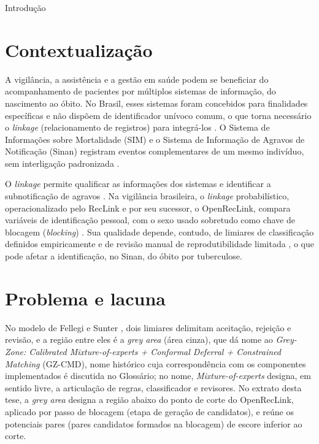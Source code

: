 \begin{chapter}{Introdução}\label{cap:introducao}



\section{Contextualização}\label{sec:contextualizacao}

A vigilância, a assistência e a gestão em saúde podem se beneficiar do acompanhamento de pacientes por múltiplos sistemas de informação, do nascimento ao óbito. No Brasil, esses sistemas foram concebidos para finalidades específicas e não dispõem de identificador unívoco comum, o que torna necessário o \textit{linkage} (relacionamento de registros) para integrá-los \cite{Camargo2000reclink}. O Sistema de Informações sobre Mortalidade (SIM) e o Sistema de Informação de Agravos de Notificação (Sinan) registram eventos complementares de um mesmo indivíduo, sem interligação padronizada \cite{Barreto2019The}.

O \textit{linkage} permite qualificar as informações dos sistemas \cite{Bartholomay2014improved} e identificar a subnotificação de agravos \cite{Oliveira2012uso}. Na vigilância brasileira, o \textit{linkage} probabilístico, operacionalizado pelo RecLink \cite{Camargo2000reclink} e por seu sucessor, o OpenRecLink, compara variáveis de identificação pessoal, com o sexo usado sobretudo como chave de blocagem (\textit{blocking}) \cite{Coeli2002blocking}. Sua qualidade depende, contudo, de limiares de classificação definidos empiricamente e de revisão manual de reprodutibilidade limitada \cite{Christen2012book}, o que pode afetar a identificação, no Sinan, do óbito por tuberculose.


\section{Problema e lacuna}\label{sec:problema-lacuna}

No modelo de Fellegi e Sunter \citeyearpar{Fellegi1969theory}, dois limiares delimitam aceitação, rejeição e revisão, e a região entre eles é a \textit{grey area} (área cinza), que dá nome ao \textit{Grey-Zone: Calibrated Mixture-of-experts + Conformal Deferral + Constrained Matching} (GZ-CMD), nome histórico cuja correspondência com os componentes implementados é discutida no Glossário; no nome, \textit{Mixture-of-experts} designa, em sentido livre, a articulação de regras, classificador e revisores. No extrato desta tese, a \textit{grey area} designa a região abaixo do ponto de corte do OpenRecLink, aplicado por passo de blocagem (etapa de geração de candidatos), e reúne os potenciais pares (pares candidatos formados na blocagem) de escore inferior ao corte.


\end{chapter}
